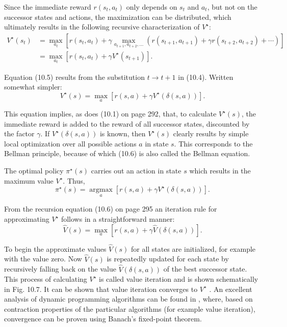 \documentclass[10pt]{book}
\begin{document}
Since the immediate reward $r\left(s_{t}, a_{t}\right)$ only depends on $s_{t}$ and $a_{t}$, but not on the successor states and actions, the maximization can be distributed, which ultimately results in the following recursive characterization of $V^{\star}$:
\begin{align*}
V^{\star}\left(s_{t}\right) & =\max _{a_{t}}\left[r\left(s_{t}, a_{t}\right)+\gamma \max _{a_{t+1}, a_{t+2}, \ldots}\left(r\left(s_{t+1}, a_{t+1}\right)+\gamma r\left(s_{t+2}, a_{t+2}\right)+\cdots\right)\right] \\
& =\max _{a_{t}}\left[r\left(s_{t}, a_{t}\right)+\gamma V^{\star}\left(s_{t+1}\right)\right] . \tag{10.5}
\end{align*}

Equation (10.5) results from the substitution $t \rightarrow t+1$ in (10.4). Written somewhat simpler:
\begin{equation*}
V^{\star}(s)=\max _{a}\left[r(s, a)+\gamma V^{\star}(\delta(s, a))\right] . \tag{10.6}
\end{equation*}

This equation implies, as does (10.1) on page 292, that, to calculate $V^{\star}(s)$, the immediate reward is added to the reward of all successor states, discounted by the factor $\gamma$. If $V^{\star}(\delta(s, a))$ is known, then $V^{\star}(s)$ clearly results by simple local optimization over all possible actions $a$ in state $s$. This corresponds to the Bellman principle, because of which (10.6) is also called the Bellman equation.

The optimal policy $\pi^{\star}(s)$ carries out an action in state $s$ which results in the maximum value $V^{\star}$. Thus,
\begin{equation*}
\pi^{\star}(s)=\underset{a}{\operatorname{argmax}}\left[r(s, a)+\gamma V^{\star}(\delta(s, a))\right] . \tag{10.7}
\end{equation*}

From the recursion equation (10.6) on page 295 an iteration rule for approximating $V^{\star}$ follows in a straightforward manner:
\begin{equation*}
\hat{V}(s)=\max _{a}[r(s, a)+\gamma \hat{V}(\delta(s, a))] . \tag{10.8}
\end{equation*}

To begin the approximate values $\hat{V}(s)$ for all states are initialized, for example with the value zero. Now $\hat{V}(s)$ is repeatedly updated for each state by recursively falling back on the value $\hat{V}(\delta(s, a))$ of the best successor state. This process of calculating $V^{\star}$ is called value iteration and is shown schematically in Fig. 10.7. It can be shown that value iteration converges to $V^{\star}$ \cite{sutton1998rl}. An excellent analysis of dynamic programming algorithms can be found in \cite{szepesvari2010rlbook}, where, based on contraction properties of the particular algorithms (for example value iteration), convergence can be proven using Banach's fixed-point theorem.
\end{document}
